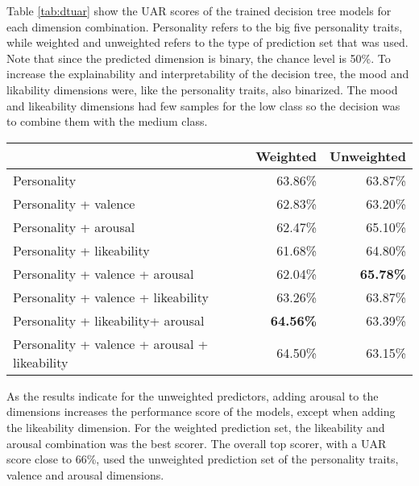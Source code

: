 Table \ref{tab:dtuar} show the UAR scores of the trained decision tree models for each dimension combination. Personality refers to the big five personality traits, while weighted and unweighted refers to the type of prediction set that was used. Note that since the predicted dimension is binary, the chance level is 50\%. To increase the explainability and interpretability of the decision tree, the mood and likability dimensions were, like the personality traits, also binarized. The mood and likeability dimensions had few samples for the low class so the decision was to combine them with the medium class.

\begin{table*}[]
\begin{tabular}{|l|r|r|}
\hline
 & \multicolumn{1}{l|}{Weighted} & \multicolumn{1}{l|}{Unweighted} \\ \hline
Personality & \cellcolor[HTML]{86CEAB}63.86\% & \cellcolor[HTML]{D1EDDF}63.87\% \\ \hline
Personality + valence & \cellcolor[HTML]{CBEADB}62.83\% & \cellcolor[HTML]{FCFEFD}63.20\% \\ \hline
Personality + arousal & \cellcolor[HTML]{E3F4EC}62.47\% & \cellcolor[HTML]{83CDA9}65.10\% \\ \hline
Personality + likeability & 61.68\% & 64.80\% \\ \hline
Personality + valence + arousal & \cellcolor[HTML]{FFFFFF}62.04\% & \cellcolor[HTML]{57BB8A}\textbf{65.78\%} \\ \hline
Personality + valence + likeability & 63.26\% & \cellcolor[HTML]{D1EDDF}63.87\% \\ \hline
Personality + likeability+ arousal & \cellcolor[HTML]{57BB8A}\textbf{64.56\%} & \cellcolor[HTML]{F0F9F5}63.39\% \\ \hline
Personality + valence + arousal + likeability & \cellcolor[HTML]{5CBD8D}64.50\% & \cellcolor[HTML]{FFFFFF}63.15\% \\ \hline
\end{tabular}
\caption{UAR scores of the modeled Decision Trees per dimension combination.}
\label{tab:dtuar}
\end{table*}

As the results indicate for the unweighted predictors, adding arousal to the dimensions increases the performance score of the models, except when adding the likeability dimension. For the weighted prediction set, the likeability and arousal combination was the best scorer. The overall top scorer, with a UAR score close to 66\%, used the unweighted prediction set of the personality traits, valence and arousal dimensions. 

